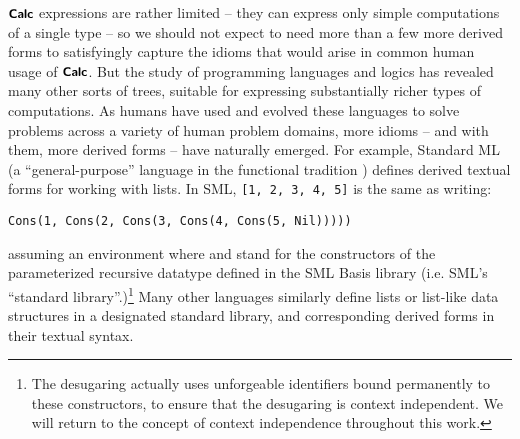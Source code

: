 $\textsf{\textbf{\small Calc}}$ expressions are rather limited -- they can express only simple computations of a single type -- so we should not expect to need more than a few more derived forms  to satisfyingly capture the  idioms that would arise in common human usage of $\textsf{\textbf{\small Calc}}$. %
But the study of programming languages and logics has revealed many other sorts of trees, suitable for expressing substantially richer types of computations.  As humans have used and evolved these languages to solve problems across a variety of human problem domains, more idioms -- and with them, more derived forms -- have naturally emerged.  For example, Standard ML (a ``general-purpose''  language in the functional tradition \cite{mthm97-for-dart,harper1997programming}) defines derived textual forms for working with lists. In SML, \lstinline{[1, 2, 3, 4, 5]} is the same as writing: 
\begin{lstlisting}[numbers=none]
Cons(1, Cons(2, Cons(3, Cons(4, Cons(5, Nil)))))
\end{lstlisting}
assuming an environment where  and  stand for the constructors of the parameterized recursive datatype  defined in the SML Basis library (i.e. SML's ``standard library''.)\footnote{The desugaring actually uses unforgeable identifiers bound permanently to these constructors, to ensure that the desugaring is context independent. We will return to the concept of context independence throughout this work.} Many other languages similarly define lists or list-like data structures in a designated standard library, and corresponding derived forms in their textual syntax. 

